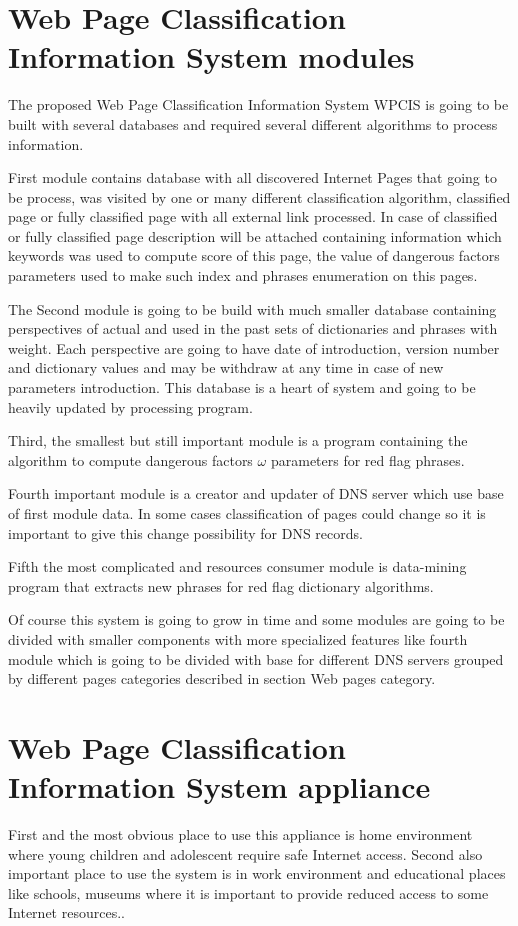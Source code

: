 \documentclass[9pt,a4paper]{extarticle}
\begin{document}
\begin{multicols}{2}
\section{Web Page Classification Information System modules}
The proposed Web Page Classification Information System WPCIS is going to be built  with several databases and required  several different algorithms to process information.

First module contains database with all discovered Internet Pages that going to be process, was visited by one or many different classification algorithm, classified page or fully classified page with all external link processed. In case of classified or fully classified page description will be attached containing information which keywords was used to compute score of this page, the value of dangerous factors parameters used to make such index and phrases enumeration on this pages.

The Second module is going to be build with much smaller database containing perspectives of actual and used in the past sets of dictionaries and phrases with weight. Each perspective are going to have date of introduction, version number and dictionary values and may be withdraw at any time in case of new parameters introduction. This database is a heart of system and going to be heavily updated by processing program.

Third, the smallest but still important module is a program containing the algorithm to compute dangerous factors \(\omega\) parameters for red flag phrases.

Fourth important module is a creator and updater of DNS server which use base of first module data. In some cases classification of pages could change so it is important to give this change possibility for DNS records.

Fifth the most complicated and resources consumer module is data-mining program that extracts new phrases for red flag dictionary algorithms.

Of course this system is going to grow in time and some modules are going to be divided with smaller components with more specialized features like fourth module which is  going to be divided with base for different DNS servers grouped by different pages categories described in section Web pages category.

\section{Web Page Classification Information System appliance}
First and the most obvious place to use this appliance is home environment where young children and adolescent require safe Internet access. Second also important place to use the system is in work environment and educational places like schools, museums where it is important to provide reduced access to some Internet resources..


\end{multicols}
\end{document}
